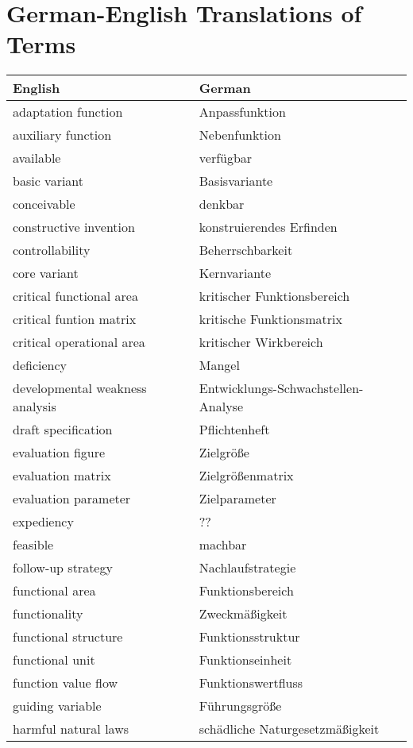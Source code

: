 \documentclass[11pt,a4paper]{article}
\begin{document}
\section{German-English Translations of Terms}
\begin{center}
  \begin{tabular}{l|l}
    English & German \\\hline
    adaptation function & Anpassfunktion \\
    auxiliary function & Nebenfunktion \\
    available & verfügbar \\
    basic variant & Basisvariante\\
    conceivable & denkbar \\
    constructive invention & konstruierendes Erfinden \\
    controllability & Beherrschbarkeit \\
    core variant & Kernvariante\\
    critical functional area & kritischer Funktionsbereich\\
    critical funtion matrix & kritische Funktionsmatrix\\
    critical operational area & kritischer Wirkbereich\\
    deficiency & Mangel \\
    developmental weakness analysis & Entwicklungs-Schwachstellen-Analyse\\
    draft specification & Pflichtenheft \\
    evaluation figure & Zielgröße\\
    evaluation matrix& Zielgrößenmatrix \\
    evaluation parameter & Zielparameter \\
    expediency & ?? \\
    feasible & machbar \\
    follow-up strategy & Nachlaufstrategie \\
    functional area & Funktionsbereich \\
    functionality & Zweckmäßigkeit \\
    functional structure & Funktionsstruktur \\
    functional unit & Funktionseinheit \\
    function value flow & Funktionswertfluss \\
    guiding variable & Führungsgröße \\
    harmful natural laws & schädliche Naturgesetzmäßigkeit\\

\end{tabular}
\end{center}
\end{document}

